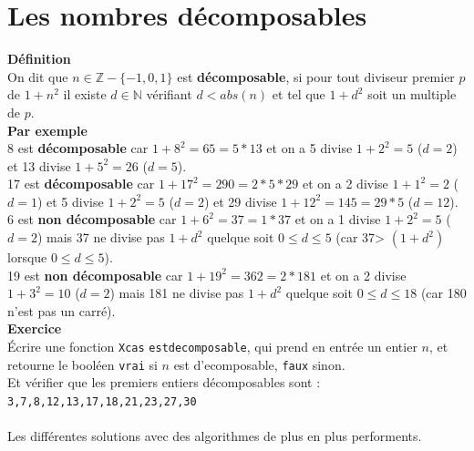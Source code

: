 \documentclass[a4paper,11pt]{book}
\newcommand{\Z}{{\mathbb{Z}}}
\newcommand{\N}{{\mathbb{N}}}
\begin{document}
\section{Les nombres d\'ecomposables}
{\bf D\'efinition}\\
On dit que $n \in \Z - \{-1,0,1\}$ est {\bf d\'ecomposable}, si pour tout 
diviseur premier $p$ de $1+n^2$ il existe $d\in \N$ v\'erifiant $d<abs(n)$ 
et tel que $1+d^2$ soit un multiple de $p$.\\
{\bf Par exemple}\\
8  est {\bf d\'ecomposable} car $1+8^2=65=5*13$ et on a 
5 divise $1+2^2=5$ ($d=2$) et 13 divise $1+5^2=26$ ($d=5$). \\
17  est {\bf d\'ecomposable} car $1+17^2=290=2*5*29$ et on a 
2 divise $1+1^2=2$ ($d=1$) et 5 divise $1+2^2=5$ ($d=2$) et 
29 divise $1+12^2=145=29*5$ ($d=12$). \\
6 est {\bf non d\'ecomposable}  car $1+6^2=37=1*37$ et on a 
1 divise $1+2^2=5$ ($d=2$) mais 37 ne divise pas $1+d^2$ quelque soit
$0\leq d\leq 5$ (car 37> $(1+d^2)$ lorsque $0\leq d\leq 5$).\\
19 est {\bf non d\'ecomposable}  car $1+19^2=362=2*181$ et on a 
2 divise $1+3^2=10$ ($d=2$) mais 181 ne divise pas $1+d^2$ quelque soit
$0\leq d\leq 18$ (car 180 n'est pas un carr\'e).\\
{\bf Exercice}\\
\'Ecrire une fonction {\tt Xcas} {\tt estdecomposable}, 
qui prend en entr\'ee un entier $n$, et retourne le bool\'een {\tt vrai}
si $n$ est d'ecomposable, {\tt faux} sinon.\\
Et v\'erifier que les premiers entiers d\'ecomposables sont :\\
{\tt 3,7,8,12,13,17,18,21,23,27,30}\\
\ \\
Les diff\'erentes solutions avec des algorithmes de plus en plus performents.
\end{document}
